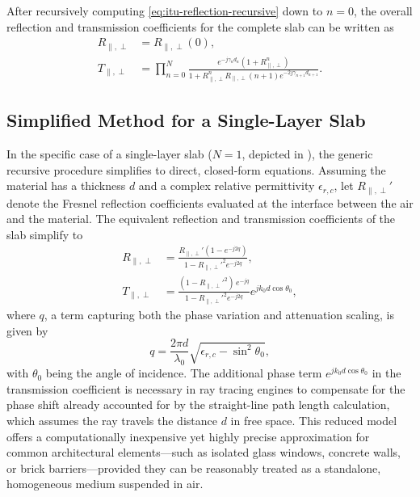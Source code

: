 After recursively computing \eqref{eq:itu-reflection-recursive} down to $n=0$, the overall reflection and transmission coefficients for the complete slab can be written as
\begin{align}
  R_{\parallel,\perp} &= R_{\parallel,\perp}(0), \\
  T_{\parallel,\perp} &= \prod_{n=0}^{N}\frac{e^{-j \gamma_{n} d_{n}} \left(1 + R_{\parallel,\perp}^n\right)}{1 + R_{\parallel,\perp}^n R_{\parallel,\perp}(n+1) e^{-2 j \gamma_{n+1} d_{n+1}}}.
\end{align}

\subsection{Simplified Method for a Single-Layer Slab}

\begin{marginfigure}
  \centering
  \caption{Plane wave incident on a single-layer slab.}
\end{marginfigure}

In the specific case of a single-layer slab ($N=1$, depicted in ), the generic recursive procedure simplifies to direct, closed-form equations. Assuming the material has a thickness $d$ and a complex relative permittivity $\epsilon_{r,c}$, let $R_{\parallel,\perp}'$ denote the Fresnel reflection coefficients evaluated at the interface between the air and the material. The equivalent reflection and transmission coefficients of the slab simplify to
\begin{align}
  R_{\parallel,\perp} &= \frac{R_{\parallel,\perp}'(1 - e^{-j 2q})}{1 - R_{\parallel,\perp}'^2 e^{-j 2q}}, \\
  T_{\parallel,\perp} &= \frac{(1 - R_{\parallel,\perp}'^2)\, e^{-j q}}{1 - R_{\parallel,\perp}'^2 e^{-j 2q}} e^{j k_0 d \cos\theta_0},
\end{align}
where $q$, a term capturing both the phase variation and attenuation scaling, is given by
\begin{equation}
  q = \frac{2\pi d}{\lambda_0} \sqrt{\epsilon_{r,c} - \sin^2\theta_0},
\end{equation}
with $\theta_0$ being the angle of incidence. The additional phase term $e^{j k_0 d \cos\theta_0}$ in the transmission coefficient is necessary in ray tracing engines to compensate for the phase shift already accounted for by the straight-line path length calculation, which assumes the ray travels the distance $d$ in \gls{free space}. This reduced model offers a computationally inexpensive yet highly precise approximation for common architectural elements---such as isolated glass windows, concrete walls, or brick barriers---provided they can be reasonably treated as a standalone, homogeneous medium suspended in air.

